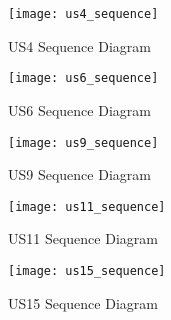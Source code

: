 \begin{figure}[H]
    \centering
    \texttt{[image: us4\_sequence]}
    \caption{US4 Sequence Diagram}
    \label{fig:us4_sequence}
\end{figure}

\begin{figure}[H]
    \centering
    \texttt{[image: us6\_sequence]}
    \caption{US6 Sequence Diagram}
    \label{fig:us6_sequence}
\end{figure}

\begin{figure}[H]
    \centering
    \texttt{[image: us9\_sequence]}
    \caption{US9 Sequence Diagram}
    \label{fig:us9_sequence}
\end{figure}

\begin{figure}[H]
    \centering
    \texttt{[image: us11\_sequence]}
    \caption{US11 Sequence Diagram}
    \label{fig:us11_sequence}
\end{figure}

\begin{figure}[H]
    \centering
    \texttt{[image: us15\_sequence]}
    \caption{US15 Sequence Diagram}
    \label{fig:us15_sequence}
\end{figure}
